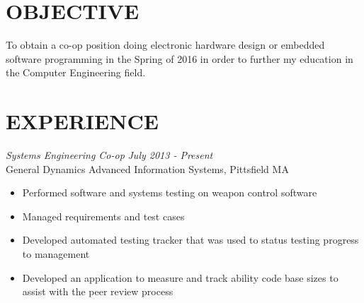 \documentclass[line,margin]{res}
\begin{document}
\setlength\columnsep{-30pt}
\address{CRC3510@RIT.EDU}
\address{(413) 376-5034}
 
\begin{resume}
 \setlength\multicolsep{2pt}

\section{OBJECTIVE}   
	To obtain a co-op position doing electronic hardware design or embedded software programming in the Spring of 2016 in order to further my education in the Computer Engineering field. 
 
\section{EXPERIENCE} 
{\sl Systems Engineering Co-op} \hfill {\sl July 2013 - Present }\\
	General Dynamics Advanced Information Systems, Pittsfield MA
	\begin{itemize}  \itemsep -2pt %
		\item Performed software and systems testing on weapon control software
		\item Managed requirements and test cases
		\item Developed automated testing tracker that was used to status testing progress to management
		\item Developed an application to measure and track 
		ability	code base sizes to assist with the peer review process
	\end{itemize}
 


\end{resume}
\end{document}
